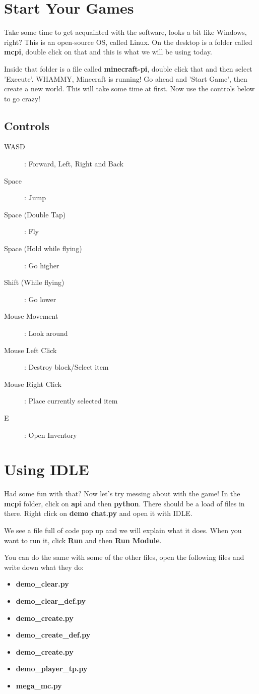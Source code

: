 \documentclass[]{paper}
\begin{document}
\section{Start Your Games}
Take some time to get acquainted with the software, looks a bit like Windows, right? This is an open-source OS, called Linux. On the desktop is a folder called \textbf{mcpi}, double click on that and this is what we will be using today. 

Inside that folder is a file called \textbf{minecraft-pi}, double click that and then select 'Execute'. WHAMMY, Minecraft is running! Go ahead and 'Start Game', then create a new world. This will take some time at first. Now use the controls below to go crazy!

\subsection*{Controls}
\begin{description}
	\item[WASD]: Forward, Left, Right and Back
	\item[Space]: Jump
	\item[Space (Double Tap)]: Fly
	\item[Space (Hold while flying)]: Go higher
	\item[Shift (While flying)]: Go lower
	\item[Mouse Movement]: Look around
	\item[Mouse Left Click]: Destroy block/Select item
	\item[Mouse Right Click]: Place currently selected item
	\item[E]: Open Inventory
\end{description}

\section{Using IDLE}
Had some fun with that? Now let's try messing about with the game! In the \textbf{mcpi} folder, click on \textbf{api} and then \textbf{python}. There should be a load of files in there. Right click on \textbf{demo  chat.py} and open it with IDLE.

We see a file full of code pop up and we will explain what it does. When you want to run it, click \textbf{Run} and then \textbf{Run Module}.

You can do the same with some of the other files, open the following files and write down what they do:
\begin{itemize}
	\item \textbf{demo\_clear.py}
	\item \textbf{demo\_clear\_def.py}
	\item \textbf{demo\_create.py}
	\item \textbf{demo\_create\_def.py}
	\item \textbf{demo\_create.py}
	\item \textbf{demo\_player\_tp.py}
	\item \textbf{mega\_mc.py}
\end{itemize}
\end{document}
